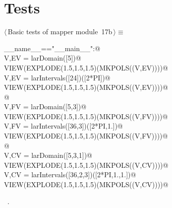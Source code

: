 \documentclass[11pt,oneside]{article}	%
\begin{document}
\section{Tests}

	
\begin{flushleft} \small \label{scrap36}
\protect{}$\langle\,$Basic tests of mapper module\nobreak\ {\footnotesize 17b}$\,\rangle\equiv$
\vspace{-1ex}
\begin{list}{}{} \item
\mbox{}\verb@if __name__=="__main__":@\\
\mbox{}\verb@   V,EV = larDomain([5])@\\
\mbox{}\verb@   VIEW(EXPLODE(1.5,1.5,1.5)(MKPOLS((V,EV))))@\\
\mbox{}\verb@   V,EV = larIntervals([24])([2*PI])@\\
\mbox{}\verb@   VIEW(EXPLODE(1.5,1.5,1.5)(MKPOLS((V,EV))))@\\
\mbox{}\verb@      @\\
\mbox{}\verb@   V,FV = larDomain([5,3])@\\
\mbox{}\verb@   VIEW(EXPLODE(1.5,1.5,1.5)(MKPOLS((V,FV))))@\\
\mbox{}\verb@   V,FV = larIntervals([36,3])([2*PI,1.])@\\
\mbox{}\verb@   VIEW(EXPLODE(1.5,1.5,1.5)(MKPOLS((V,FV))))@\\
\mbox{}\verb@      @\\
\mbox{}\verb@   V,CV = larDomain([5,3,1])@\\
\mbox{}\verb@   VIEW(EXPLODE(1.5,1.5,1.5)(MKPOLS((V,CV))))@\\
\mbox{}\verb@   V,CV = larIntervals([36,2,3])([2*PI,1.,1.])@\\
\mbox{}\verb@   VIEW(EXPLODE(1.5,1.5,1.5)(MKPOLS((V,CV))))@\\
\mbox{}\verb@@{\NWsep}
\end{list}
\vspace{-1ex}
\footnotesize\addtolength{\baselineskip}{-1ex}
\begin{list}{}{\setlength{\itemsep}{-\parsep}\setlength{\itemindent}{-\leftmargin}}
\item \NWtxtMacroRefIn\ .
\end{list}
\end{flushleft}
\end{document}
